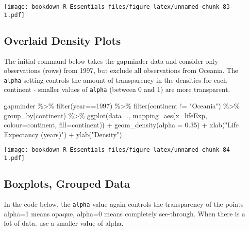 \documentclass[
]{book}
\newenvironment{Shaded}{\begin{snugshade}}{\end{snugshade}}
\newcommand{\AttributeTok}[1]{\textcolor[rgb]{0.77,0.63,0.00}{#1}}
\newcommand{\DecValTok}[1]{\textcolor[rgb]{0.00,0.00,0.81}{#1}}
\newcommand{\FloatTok}[1]{\textcolor[rgb]{0.00,0.00,0.81}{#1}}
\newcommand{\FunctionTok}[1]{\textcolor[rgb]{0.00,0.00,0.00}{#1}}
\newcommand{\NormalTok}[1]{#1}
\newcommand{\SpecialCharTok}[1]{\textcolor[rgb]{0.00,0.00,0.00}{#1}}
\newcommand{\StringTok}[1]{\textcolor[rgb]{0.31,0.60,0.02}{#1}}
\begin{document}
\texttt{[image: bookdown-R-Essentials\_files/figure-latex/unnamed-chunk-83-1.pdf]}

\hypertarget{overlaid-density-plots}{%
\subsection{Overlaid Density Plots}\label{overlaid-density-plots}}

The initial command below takes the gapminder data and consider only observations (rows) from 1997, but exclude all observations from Oceania. The \texttt{alpha} setting controls the amount of transparency in the densities for each continent - smaller values of \texttt{alpha} (between 0 and 1) are more transparent.

\begin{Shaded}
\begin{Highlighting}[]
\NormalTok{gapminder }\SpecialCharTok{\%\textgreater{}\%} 
  \FunctionTok{filter}\NormalTok{(year}\SpecialCharTok{==}\DecValTok{1997}\NormalTok{) }\SpecialCharTok{\%\textgreater{}\%} 
  \FunctionTok{filter}\NormalTok{(continent }\SpecialCharTok{!=} \StringTok{"Oceania"}\NormalTok{) }\SpecialCharTok{\%\textgreater{}\%} 
  \FunctionTok{group\_by}\NormalTok{(continent) }\SpecialCharTok{\%\textgreater{}\%}
\FunctionTok{ggplot}\NormalTok{(}\AttributeTok{data=}\NormalTok{., }\AttributeTok{mapping=}\FunctionTok{aes}\NormalTok{(}\AttributeTok{x=}\NormalTok{lifeExp, }\AttributeTok{colour=}\NormalTok{continent, }\AttributeTok{fill=}\NormalTok{continent)) }\SpecialCharTok{+} 
  \FunctionTok{geom\_density}\NormalTok{(}\AttributeTok{alpha =} \FloatTok{0.35}\NormalTok{) }\SpecialCharTok{+} 
  \FunctionTok{xlab}\NormalTok{(}\StringTok{"Life Expectancy (years)"}\NormalTok{) }\SpecialCharTok{+}
  \FunctionTok{ylab}\NormalTok{(}\StringTok{"Density"}\NormalTok{)}
\end{Highlighting}
\end{Shaded}

\texttt{[image: bookdown-R-Essentials\_files/figure-latex/unnamed-chunk-84-1.pdf]}

\hypertarget{boxplots-grouped-data}{%
\subsection{Boxplots, Grouped Data}\label{boxplots-grouped-data}}

In the code below, the \texttt{alpha} value again controls the transparency of the points alpha=1 means opaque, alpha=0 means completely see-through. When there is a lot of data, use a smaller value of alpha.
\end{document}
